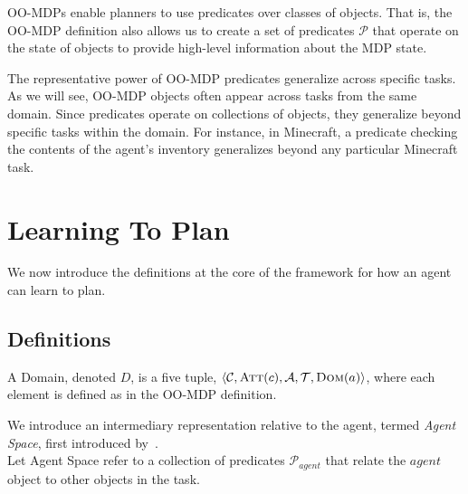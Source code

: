 \documentclass[11pt]{article}
\begin{document}
OO-MDPs enable planners to use predicates over classes of objects. That is, the
OO-MDP definition also allows us to create a set of predicates $\mathcal{P}$ that
operate on the state of objects to provide high-level
information about the MDP state.

The representative power of OO-MDP predicates generalize across specific tasks. As we will see, OO-MDP objects
often appear across tasks from the same domain. Since predicates operate on collections
of objects, they generalize beyond specific tasks within the domain.
For instance, in Minecraft, a predicate checking the contents of the agent's inventory
generalizes beyond any particular Minecraft task. 
%
%
%




\section{Learning To Plan}
\label{sec:learning_to_plan}

We now introduce the definitions at the core of the framework for how an agent can learn to plan. \\

\subsection{Definitions}
{ A \textup{Domain}, denoted $D$, is a five tuple, $\langle \mathcal{C}, \textsc{Att}(c), \mathcal{A}, \mathcal{T}, \textsc{Dom}(a) \rangle$, where each element is defined as in the OO-MDP definition.} 


We introduce an intermediary representation relative to the agent, termed {\it Agent Space}, first introduced by~\cite{konidaris2006framework}.\\

{ Let \textup{Agent Space} refer to a collection of predicates $\mathcal{P}_{agent}$ that relate the $agent$ object to other objects in the task}.
\end{document}
